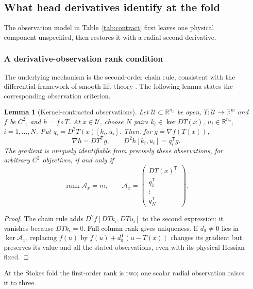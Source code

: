\documentclass[10pt,a4paper]{article}
\newtheorem{lemma}{Lemma}
\begin{document}
\subsection{What head derivatives identify at the fold}
\label{sec:stationarity}
The observation model in Table~\ref{tab:contract} first leaves one physical component unspecified, then restores it with a radial second derivative.

\subsubsection{A derivative-observation rank condition}
The underlying mechanism is the second-order chain rule, consistent with the differential framework of smooth-lift theory \cite{lifts}. The following lemma states the corresponding observation criterion.
\begin{lemma}[Kernel-contracted observations]
\label{lem:observation}
Let $\mathcal U\subset\mathbb R^{n_x}$ be open, $T:\mathcal U\to\mathbb R^m$ and $f$ be $C^2$, and $h=f\circ T$. At $x\in\mathcal U$, choose $N$ pairs $k_i\in\ker DT(x)$, $u_i\in\mathbb R^{n_x}$, $i=1,\ldots,N$. Put $q_i=D^2T(x)[k_i,u_i]$. Then, for $g=\nabla f(T(x))$,
\begin{equation}
 \nabla h=DT^{\mathsf T}g,\qquad
 D^2h[k_i,u_i]=q_i^{\mathsf T}g.
 \label{eq:observation}
\end{equation}
The gradient is uniquely identifiable from precisely these observations, for arbitrary $C^2$ objectives, if and only if
\begin{equation}
 \operatorname{rank}\mathcal A_x=m,\qquad
 \mathcal A_x=\begin{pmatrix}DT(x)^{\mathsf T}\\q_1^{\mathsf T}\\\vdots\\q_N^{\mathsf T}\end{pmatrix}.
 \label{eq:observationrank}
\end{equation}
\end{lemma}
\begin{proof}
The chain rule adds $D^2f[DTk_i,DTu_i]$ to the second expression; it vanishes because $DTk_i=0$. Full column rank gives uniqueness. If $d_0\ne0$ lies in $\ker\mathcal A_x$, replacing $f(u)$ by $f(u)+d_0^{\mathsf T}(u-T(x))$ changes its gradient but preserves its value and all the stated observations, even with its physical Hessian fixed.
\end{proof}
At the Stokes fold the first-order rank is two; one scalar radial observation raises it to three.
\end{document}
